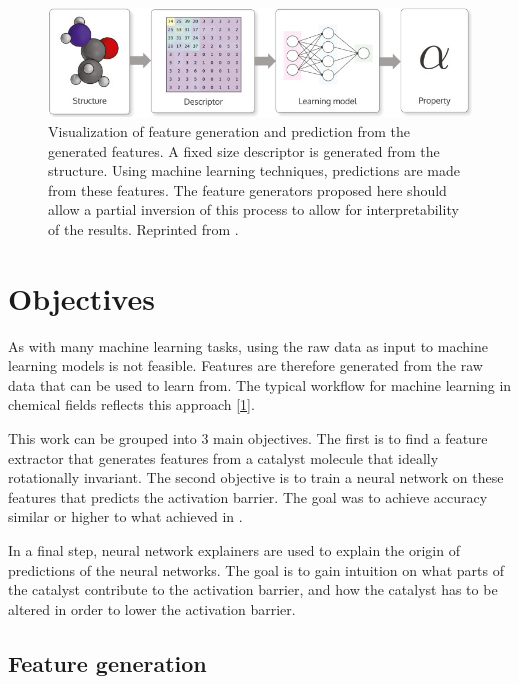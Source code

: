 \begin{figure}[H]
  \centering
  \includegraphics[width=12cm]{figures/introduction/chem-descriptor.jpg}
  \caption[Machine learning in chemistry]{Visualization of feature generation and prediction from the generated features. 
  A fixed size descriptor is generated from the structure. Using machine learning techniques, 
  predictions are made from these features.
  The feature generators proposed here should allow a partial inversion of this process to allow for interpretability of the results.
  Reprinted from \cite{dscribe}.}
  \label{fig:feature-process}
\end{figure}

\section{Objectives}

As with many machine learning tasks, using the raw data as input to machine learning models is not feasible.
Features are therefore generated from the raw data that can be used to learn from.
The typical workflow for machine learning in chemical fields reflects this approach [\ref{fig:feature-process}].

This work can be grouped into 3 main objectives. 
The first is to find a feature extractor that generates features from a catalyst molecule that ideally rotationally invariant.
The second objective is to train a neural network on these features that predicts the activation barrier.
The goal was to achieve accuracy similar or higher to what \citeauthor{friederich_dos} achieved in \cite{friederich_dos}.

In a final step, neural network explainers are used to explain the origin of predictions of the neural networks.
The goal is to gain intuition on what parts of the catalyst contribute to the activation barrier, 
and how the catalyst has to be altered in order to lower the activation barrier.


\subsection{Feature generation}

